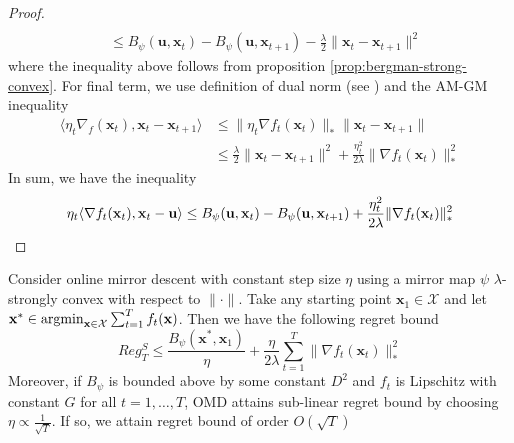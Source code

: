 \documentclass[12pt, a4paper]{report}
\begin{document}
\begin{proof}
\begin{align*}
    \\
    &\leq B_\psi(\mathbf{u}, \mathbf{x}_t) - B_\psi(\mathbf{u}, \mathbf{x}_{t+1}) - \frac{\lambda}{2} \lVert \mathbf{x}_t - \mathbf{x}_{t+1} \rVert^2
\end{align*}
where the inequality above follows from proposition \ref{prop:bergman-strong-convex}.
For final term, we use definition of dual norm (see \cite[Remark 4.18]{Orabona2019OnlineLearning}) and the AM-GM inequality
\begin{align*}
    \langle \eta_t \nabla_f(\mathbf{x}_t), \mathbf{x}_t - \mathbf{x}_{t+1} \rangle &\leq \lVert \eta_t \nabla f_t(\mathbf{x}_t) \rVert_* \lVert \mathbf{x}_t - \mathbf{x}_{t+1} \rVert 
    \\
    &\leq \frac{\lambda}{2} \lVert \mathbf{x}_t - \mathbf{x}_{t+1} \rVert^2 + \frac{\eta_t^2}{2\lambda}\lVert \nabla f_t(\mathbf{x}_t) \rVert_*^2
\end{align*}
In sum, we have the inequality
\begin{equation*}
    \eta_t\langle \nabla f_t(\mathbf{x}_t), \mathbf{x}_t - \mathbf{u} \rangle \leq B_\psi(\mathbf{u}, \mathbf{x}_t) - B_\psi(\mathbf{u}, \mathbf{x}_{t+1}) + \frac{\eta_t^2}{2\lambda}\lVert \nabla f_t(\mathbf{x}_t) \rVert_*^2 \qedhere
\end{equation*}
\end{proof}
\begin{thm} \label{prop:omd-bound}
Consider online mirror descent with constant step size $\eta$ using a mirror map $\psi$ $\lambda$-strongly convex with respect to $\lVert \cdot \rVert$. Take any starting point $\mathbf{x}_1 \in \mathcal{X}$ and let $\mathbf{x}^* \in \operatorname*{argmin}_{\mathbf{x} \in \mathcal{X}} \sum_{t=1}^T f_t(\mathbf{x})$. Then we have the following regret bound
\begin{equation*}
    Reg_T^S \leq \frac{B_\psi(\mathbf{x}^*, \mathbf{x}_1)}{\eta} + \frac{\eta}{2\lambda} \sum_{t=1}^T \lVert \nabla f_t(\mathbf{x}_t) \rVert_*^2
\end{equation*}
Moreover, if $B_\psi$ is bounded above by some constant $D^2$ and $f_t$ is Lipschitz with constant $G$ for all $t = 1, \dots, T$, OMD attains sub-linear regret bound by choosing $\eta \propto \frac{1}{\sqrt{T}}$. If so, we attain regret bound of order $O(\sqrt{T})$
\end{thm}
\end{document}
